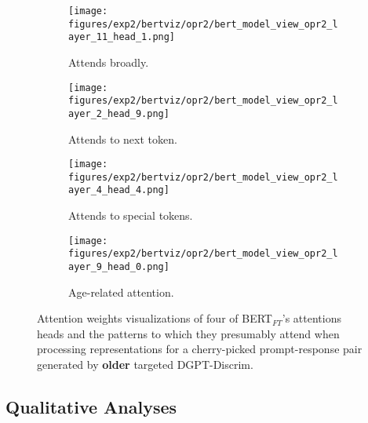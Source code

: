 \begin{figure}[H]
     \centering
     \begin{subfigure}[b]{0.22\textwidth}
        \centering
        \texttt{[image: figures/exp2/bertviz/opr2/bert\_model\_view\_opr2\_layer\_11\_head\_1.png]}
        \captionsetup{font=footnotesize,labelfont=footnotesize}
        \caption{Attends broadly.}
        \label{subfig:bertviz_model_view_opr2_broad}
     \end{subfigure}
     \quad
     \begin{subfigure}[b]{0.22\textwidth}
        \centering
        \texttt{[image: figures/exp2/bertviz/opr2/bert\_model\_view\_opr2\_layer\_2\_head\_9.png]}
        \captionsetup{font=footnotesize,labelfont=footnotesize}
        \caption{Attends to next token.}
        \label{subfig:bertviz_model_view_opr2_next}
     \end{subfigure}
    \quad
    \begin{subfigure}[b]{0.22\textwidth}
        \centering
        \texttt{[image: figures/exp2/bertviz/opr2/bert\_model\_view\_opr2\_layer\_4\_head\_4.png]}
        \captionsetup{font=footnotesize,labelfont=footnotesize}
        \caption{Attends to special tokens.}
        \label{subfig:bertviz_model_view_opr2_special}
     \end{subfigure}
    \quad
     \begin{subfigure}[b]{0.22\textwidth}
        \centering
        \texttt{[image: figures/exp2/bertviz/opr2/bert\_model\_view\_opr2\_layer\_9\_head\_0.png]}
        \captionsetup{font=footnotesize,labelfont=footnotesize}
        \caption{Age-related attention.}
        \label{subfig:bertviz_model_view_opr2_age}
     \end{subfigure}
    \caption{Attention weights visualizations of four of BERT$_{FT}$'s attentions heads and the patterns to which they presumably attend when processing representations for a cherry-picked prompt-response pair generated by \textbf{older} targeted DGPT-Discrim.}
    \label{fig:bertviz_model_view_opr2}
\end{figure}

\subsection{Qualitative Analyses}
\label{subsec:ctg_anal_qualitative}


